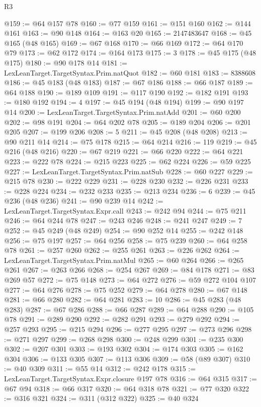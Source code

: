 \begin{lexlean}{R3}
\begin{coremodule}
@159 := @64 @157 @78
@160 := @77 @159
@161 := @151 @160
@162 := @144 @161
@163 := @90 @148
@164 := @163 @20
@165 := 2147483647
@168 := @45 @165 (@48 @165)
@169 := @67 @168
@170 := @66 @169
@172 := @64 @170 @79
@173 := @62 @172
@174 := @164 @173
@175 := 3
@178 := @45 @175 (@48 @175)
@180 := @90 @178 @14
@181 := LexLeanTarget.TargetSyntax.Prim.natQuot
@182 := @60 @181
@183 := 8388608
@186 := @45 @183 (@48 @183)
@187 := @67 @186
@188 := @66 @187
@189 := @64 @188
@190 := @189 @109
@191 := @117 @190
@192 := @182 @191
@193 := @180 @192
@194 := 4
@197 := @45 @194 (@48 @194)
@199 := @90 @197 @14
@200 := LexLeanTarget.TargetSyntax.Prim.natAdd
@201 := @60 @200
@202 := @98 @191
@204 := @64 @202 @78
@205 := @189 @204
@206 := @201 @205
@207 := @199 @206
@208 := 5
@211 := @45 @208 (@48 @208)
@213 := @90 @211 @14
@214 := @75 @178
@215 := @64 @214
@216 := 119
@219 := @45 @216 (@48 @216)
@220 := @67 @219
@221 := @66 @220
@222 := @64 @221
@223 := @222 @78
@224 := @215 @223
@225 := @62 @224
@226 := @59 @225
@227 := LexLeanTarget.TargetSyntax.Prim.natSub
@228 := @60 @227
@229 := @215 @78
@230 := @222 @229
@231 := @228 @230
@232 := @226 @231
@233 := @228 @224
@234 := @232 @233
@235 := @213 @234
@236 := 6
@239 := @45 @236 (@48 @236)
@241 := @90 @239 @14
@242 := LexLeanTarget.TargetSyntax.Expr.call
@243 := @242 @94
@244 := @75 @211
@246 := @64 @244 @78
@247 := @243 @246
@248 := @241 @247
@249 := 7
@252 := @45 @249 (@48 @249)
@254 := @90 @252 @14
@255 := @242 @148
@256 := @75 @197
@257 := @64 @256
@258 := @75 @239
@260 := @64 @258 @78
@261 := @257 @260
@262 := @255 @261
@263 := @226 @262
@264 := LexLeanTarget.TargetSyntax.Prim.natMul
@265 := @60 @264
@266 := @265 @261
@267 := @263 @266
@268 := @254 @267
@269 := @84 @178
@271 := @83 @269 @57
@272 := @75 @148
@273 := @64 @272
@276 := @59 @272 @104 @107
@277 := @64 @276
@278 := @75 @252
@279 := @64 @278
@280 := @67 @148
@281 := @66 @280
@282 := @64 @281
@283 := 10
@286 := @45 @283 (@48 @283)
@287 := @67 @286
@288 := @66 @287
@289 := @64 @288
@290 := @105 @78
@291 := @289 @290
@292 := @282 @291
@293 := @279 @292
@294 := @257 @293
@295 := @215 @294
@296 := @277 @295
@297 := @273 @296
@298 := @271 @297
@299 := @268 @298
@300 := @248 @299
@301 := @235 @300
@302 := @207 @301
@303 := @193 @302
@304 := @174 @303
@305 := @162 @304
@306 := @133 @305
@307 := @113 @306
@309 := @58 (@89 @307)
@310 := @40 @309
@311 := @55 @14
@312 := @242 @178
@315 := LexLeanTarget.TargetSyntax.Expr.closure @197 @78
@316 := @64 @315
@317 := @67 @94
@318 := @66 @317
@320 := @64 @318 @78
@321 := @77 @320
@322 := @316 @321
@324 := @311 (@312 @322)
@325 := @40 @324

\end{coremodule}
\end{lexlean}
